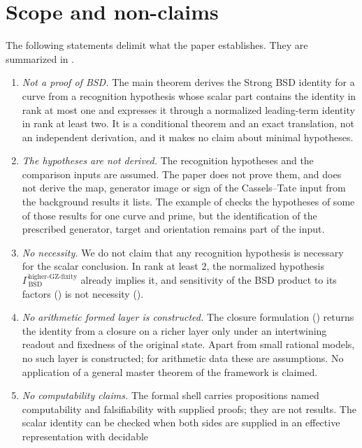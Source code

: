 \documentclass[11pt]{article}
\theoremstyle{definition}
\newcommand{\GammaGZ}{\Gamma_{\mathrm{BSD}}^{\mathrm{higher\text{-}GZ\text{-}fixity}}}
\begin{document}
 \section{Scope and non-claims}\label{sec:scope}


The following statements delimit what the paper establishes.  They are
summarized in .

\begin{enumerate}
\item \emph{Not a proof of BSD.}  The main theorem derives the Strong BSD
  identity for a curve from a recognition hypothesis whose scalar part
  contains the identity in rank at most one and expresses it through a
  normalized leading-term identity in rank at least two.  It is a
  conditional theorem and an exact translation, not an independent
  derivation, and it makes no claim about minimal hypotheses.
\item \emph{The hypotheses are not derived.}  The recognition hypotheses
  and the comparison inputs are assumed.  The paper does not prove them,
  and does not derive the map, generator image or sign of the
  Cassels--Tate input from the background results it lists.  The example
  of  checks the hypotheses of some of those results
  for one curve and prime, but the identification of the prescribed
  generator, target and orientation remains part of the input.
\item \emph{No necessity.}  We do not claim that any recognition
  hypothesis is necessary for the scalar conclusion.  In rank at least
  $2$, the normalized hypothesis $\GammaGZ$ already implies it, and
  sensitivity of the BSD product to its factors
  () is not necessity
  ().
\item \emph{No arithmetic formed layer is constructed.}  The closure formulation
  () returns the identity from a closure on a
  richer layer only under an intertwining readout and fixedness of the
  original state.  Apart from small rational models, no such layer is
  constructed; for arithmetic data these are assumptions.  No application of
  a general master theorem of the framework is claimed.
\item \emph{No computability claims.}  The formal shell carries
  propositions named computability and falsifiability with supplied
  proofs; they are not results.  The scalar identity can be checked when
  both sides are supplied in an effective representation with decidable

\end{enumerate}
\end{document}
